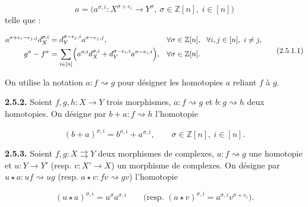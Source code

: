 \begin{equation*}
  a=\bigl(a^{\sigma,i}\colon X^{\sigma+e_i}\longrightarrow Y^\sigma,
    \ \sigma\in\mathbb Z[n],\ i\in[n]\bigr)
\end{equation*}
telle que :

\begin{equation}
  \begin{aligned}
    a^{\sigma+e_i-e_j,j}d_X^{\sigma,i}
      &=d_Y^{\sigma-e_j,i}a^{\sigma-e_j,j},
      &&\forall\sigma\in\mathbb Z[n],\
        \ \forall i,j\in[n],\ i\ne j,\\
    g^\sigma-f^\sigma
      &=\sum_{i\in[n]}\Bigl(
          a^{\sigma,i}d_X^{\sigma,i}
          +d_Y^{\sigma-e_i,i}a^{\sigma-e_i,i}\Bigr),
      &&\forall\sigma\in\mathbb Z[n].
  \end{aligned}
  \tag{2.5.1.1}
\end{equation}

On utilise la notation $a\colon f\rightsquigarrow g$ pour désigner les
homotopies $a$ reliant $f$ à $g$.

\noindent\textbf{2.5.2.}\quad
Soient $f,g,h\colon X\longrightarrow Y$ trois morphismes,
$a\colon f\rightsquigarrow g$ et $b\colon g\rightsquigarrow h$ deux
homotopies. On désigne par $b+a\colon f\rightsquigarrow h$ l'homotopie

\begin{equation*}
  (b+a)^{\sigma,i}=b^{\sigma,i}+a^{\sigma,i},
  \qquad \sigma\in\mathbb Z[n],\ i\in[n].
\end{equation*}

\noindent\textbf{2.5.3.}\quad
Soient $f,g\colon X\rightrightarrows Y$ deux morphismes de complexes,
$a\colon f\rightsquigarrow g$ une homotopie et
$u\colon Y\longrightarrow Y'$ (resp. $v\colon X'\longrightarrow X$) un
morphisme de complexes. On désigne par
$u\star a\colon uf\rightsquigarrow ug$ (resp.
$a\star v\colon fv\rightsquigarrow gv$) l'homotopie

\begin{equation*}
  (u\star a)^{\sigma,i}=u^\sigma a^{\sigma,i}
  \qquad
  \text{(resp. }(a\star v)^{\sigma,i}
    =a^{\sigma,i}v^{\sigma+e_i}\text{)}.
\end{equation*}
